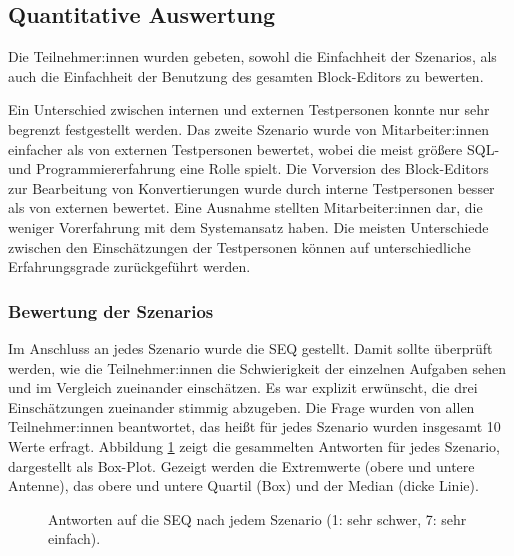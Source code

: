 \subsection{Quantitative Auswertung}
\label{sec:quantitative}

Die Teilnehmer:innen wurden gebeten, sowohl die Einfachheit der Szenarios, als auch die Einfachheit der Benutzung des gesamten Block-Editors zu bewerten.

Ein Unterschied zwischen internen und externen Testpersonen konnte nur sehr begrenzt festgestellt werden. Das zweite Szenario wurde von Mitarbeiter:innen einfacher als von externen Testpersonen bewertet, wobei die meist größere \ac{SQL}- und Programmiererfahrung eine Rolle spielt. Die Vorversion des Block-Editors zur Bearbeitung von Konvertierungen wurde durch interne Testpersonen besser als von externen bewertet. Eine Ausnahme stellten Mitarbeiter:innen dar, die weniger Vorerfahrung mit dem Systemansatz haben. Die meisten Unterschiede zwischen den Einschätzungen der Testpersonen können auf unterschiedliche  Erfahrungsgrade zurückgeführt werden.

\subsubsection{Bewertung der Szenarios}

Im Anschluss an jedes Szenario wurde die \ac{SEQ} gestellt. Damit sollte überprüft werden, wie die Teilnehmer:innen die Schwierigkeit der einzelnen Aufgaben sehen und im Vergleich zueinander einschätzen. Es war explizit erwünscht, die drei Einschätzungen zueinander stimmig abzugeben. Die Frage wurden von allen Teilnehmer:innen beantwortet, das heißt für jedes Szenario wurden insgesamt 10 Werte erfragt. Abbildung \ref{fig:seq} zeigt die gesammelten Antworten für jedes Szenario, dargestellt als Box-Plot. Gezeigt werden die Extremwerte (obere und untere Antenne), das obere und untere Quartil (Box) und der Median (dicke Linie).

\begin{figure}[!ht]
  \datatable
  \centering
  \caption{Antworten auf die \acs{SEQ} nach jedem Szenario (1: sehr schwer, 7: sehr einfach).}
  \label{fig:seq}
\end{figure}

